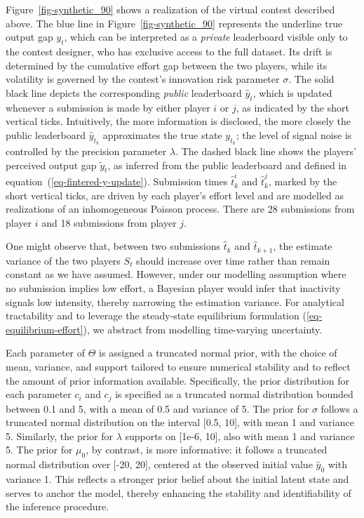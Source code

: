 \documentclass[mnsc]{informs3}
\begin{document}
Figure~\ref{fig-synthetic_90} shows a realization of the virtual contest described above.
The blue line in Figure~\ref{fig-synthetic_90} represents the underline true output gap $y_t$, which can be interpreted as a \textit{private} leaderboard visible only to the contest designer, who has exclusive access to the full dataset.
Its drift is determined by the cumulative effort gap between the two players, while its volatility is governed by the contest’s innovation risk parameter $\sigma$. 
The solid black line depicts the corresponding \textit{public} leaderboard $\hat{y}_t$, which is updated whenever a submission is made by either player $i$ or $j$, as indicated by the short vertical ticks.
Intuitively, the more information is disclosed, the more closely the public leaderboard $\hat{y}_{t_k}$ approximates the true state $y_{t_k}$; the level of signal noise is controlled by the precision parameter $\lambda$.
The dashed black line shows the players’ perceived output gap $\tilde{y}_t$, as inferred from the public leaderboard and defined in equation~(\ref{eq-fintered-y-update}).
Submission times $\hat{t}^i_k$ and $\hat{t}^j_k$, marked by the short vertical ticks, are driven by each player’s effort level and are modelled as realizations of an inhomogeneous Poisson process.
There are 28 submissions from player $i$ and 18 submissions from player $j$. 

One might observe that, between two submissions $\hat{t}_{k}$ and $\hat{t}_{k+1}$, the estimate variance of the two players $S_t$ should increase over time rather than remain constant as we have assumed. 
However, under our modelling assumption where no submission implies low effort, a Bayesian player would infer that inactivity signals low intensity, thereby narrowing the estimation variance. 
For analytical tractability and to leverage the steady-state equilibrium formulation (\ref{eq-equilibrium-effort}), we abstract from modelling time-varying uncertainty.

Each parameter of $\Theta$ is assigned a truncated normal prior, with the choice of mean, variance, and support tailored to ensure numerical stability and to reflect the amount of prior information available.
Specifically, the prior distribution for each parameter $c_i$ and $c_j$ is specified as a truncated normal distribution bounded between 0.1 and 5, with a mean of 0.5 and variance of 5.
The prior for $\sigma$ follows a truncated normal distribution on the interval [0.5, 10], with mean 1 and variance 5.
Similarly, the prior for $\lambda$ supports on [1e-6, 10], also with mean 1 and variance 5.
The prior for $\mu_0$, by contrast, is more informative: it follows a truncated normal distribution over [-20, 20], centered at the observed initial value $\hat{y}_0$ with variance 1.
This reflects a stronger prior belief about the initial latent state and serves to anchor the model, thereby enhancing the stability and identifiability of the inference procedure.
\end{document}
